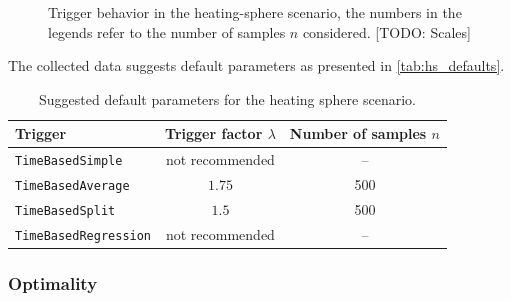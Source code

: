 \begin{figure}[htpb]
\begin{subfigure}{0.45\textwidth}
	\end{subfigure}%
	\caption{Trigger behavior in the heating-sphere scenario, the numbers in the legends refer to the number of samples $n$ considered. [TODO: Scales]}
	\label{fig:params_hs}
\end{figure}

The collected data suggests default parameters as presented in \autoref{tab:hs_defaults}.
\begin{table}[htpb]
	\centering
	\begin{tabular}{lcc}
		\toprule
		\textbf{Trigger}             & \textbf{Trigger factor $\lambda$} & \textbf{Number of samples $n$} \\ [0em]
		\midrule
		\texttt{TimeBasedSimple}     & not recommended                   & --                             \\
		\texttt{TimeBasedAverage}    & $1.75$                            & 500                            \\
		\texttt{TimeBasedSplit}      & $1.5$                             & 500                            \\
		\texttt{TimeBasedRegression} & not recommended                   & --                             \\
		\bottomrule
	\end{tabular}
	\caption{Suggested default parameters for the heating sphere scenario.}
	\label{tab:hs_defaults}
\end{table}



\subsubsection{Optimality}

